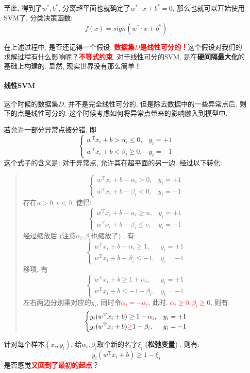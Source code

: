 至此, 得到了$w^*, b^*$, 分离超平面也就确定了$w^* \cdot x + b^* = 0$, 那么也就可以开始使用SVM了, 分类决策函数: 
$$
f(x) = sign(w^* \cdot x + b^*)
$$

在上述过程中, 是否还记得一个假设: \textbf{\textcolor{red}{数据集$D$是线性可分的！}}这个假设对我们的求解过程有什么影响呢？\textbf{\textcolor{red}{不等式约束}}. 对于线性可分的SVM, 是在\textbf{硬间隔最大化}的基础上构建的. 显然, 现实世界没有那么简单！

\paragraph{线性SVM}
这个时候的数据集$D$, 并不是完全线性可分的, 但是除去数据中的一些异常点后, 剩下的点是线性可分的. 这个时候考虑如何将异常点带来的影响融入到模型中. 

若允许一部分异常点被分错, 即
$$
\begin{cases}
	{w}^{\mathrm{T}} {x}_{i}+b > \alpha_i \leq 0, & y_{i}=+1 \\ 
	{w}^{\mathrm{T}} {x}_{i}+b < \beta_i \geq 0, & y_{i}=-1
\end{cases}
$$ 
这个式子的含义是: 对于异常点, 允许其在超平面的另一边. 经过以下转化: 
\begin{quotation}
	$$
	\begin{cases}
		{w}^{\mathrm{T}} {x}_{i}+b - \alpha_i > 0, & y_{i}=+1 \\ 
		{w}^{\mathrm{T}} {x}_{i}+b - \beta_i < 0, & y_{i}=-1
	\end{cases}
	$$
	存在$u >0, v < 0$, 使得: 
	$$
	\begin{cases}
		{w}^{\mathrm{T}} {x}_{i}+b - \alpha_i \geq u, & y_{i}=+1 \\ 
		{w}^{\mathrm{T}} {x}_{i}+b - \beta_i \leq v, & y_{i}=-1
	\end{cases}
	$$
	经过缩放后 (注意$\alpha_i, \beta_i$也缩放了) , 有: 
	$$
	\begin{cases}
		{w}^{\mathrm{T}} {x}_{i}+b - \alpha_i \geq 1, & y_{i}=+1 \\ 
		{w}^{\mathrm{T}} {x}_{i}+b - \beta_i \leq -1, & y_{i}=-1
	\end{cases}
	$$
	移项, 有
	$$
	\begin{cases}
		{w}^{\mathrm{T}} {x}_{i}+b \geq 1 + \alpha_i, & y_{i}=+1 \\ 
		{w}^{\mathrm{T}} {x}_{i}+b \leq -1 + \beta_i , & y_{i}=-1
	\end{cases}
	$$
	左右两边分别乘对应的$y_i$, 同时令\textcolor{red}{$\alpha_i = -\alpha_i$}, 此时, \textbf{\textcolor{red}{$\alpha_i \geq 0, \beta_i \geq 0$}}, 则有: 
	$$
	\begin{cases}
		y_i( {w}^{\mathrm{T}} {x}_{i}+b ) \geq 1 - \alpha_i, & y_{i}=+1 \\ 
		y_i( {w}^{\mathrm{T}} {x}_{i}+b) \textcolor{red}{\geq} 1 - \beta_i , & y_{i}=-1
	\end{cases}
	$$	
\end{quotation}
针对每个样本$(x_i, y_i)$, 给$\alpha_i, \beta_i$取个新的名字$\xi_i$ (\textbf{松弛变量}) , 则有: 
$$
y_i( {w}^{\mathrm{T}} {x}_{i}+b ) \geq 1 - \xi_i
$$
是否感觉\textbf{\textcolor{red}{又回到了最初的起点}}？

